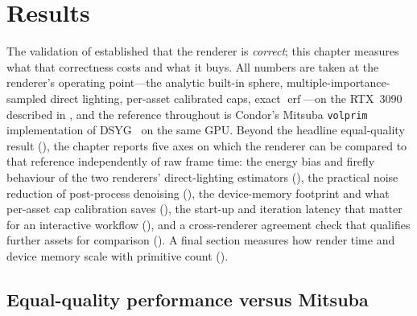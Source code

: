 \chapter{Results}
\label{ch:results}

The validation of  established that the renderer is \emph{correct}; this chapter
measures what that correctness costs and what it buys. All numbers are taken at the renderer's
operating point---the analytic built-in sphere, multiple-importance-sampled direct lighting, per-asset
calibrated caps, exact \(\operatorname{erf}\)---on the RTX~3090 described in , and the
reference throughout is Condor's Mitsuba \texttt{volprim} implementation of
DSYG~\cite{DSYG} on the same GPU. Beyond the headline equal-quality result (),
the chapter reports five axes on which the renderer can be compared to that reference independently of raw frame time: the energy bias and firefly behaviour of the two
renderers' direct-lighting estimators (), the practical noise reduction of
post-process denoising (), the device-memory footprint and what per-asset
cap calibration saves (), the start-up and iteration latency that matter for
an interactive workflow (), and a cross-renderer agreement check that
qualifies further assets for comparison (). A final section measures how
render time and device memory scale with primitive count ().

\section{Equal-quality performance versus Mitsuba}
\label{sec:results-perf}

